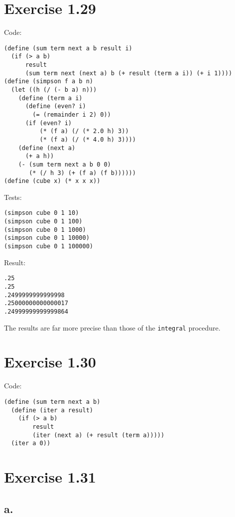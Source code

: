 \documentclass[../main.tex]{subfiles}
\begin{document}
\section{Exercise 1.29}

Code:

\begin{lstlisting}
(define (sum term next a b result i)
  (if (> a b)
      result
      (sum term next (next a) b (+ result (term a i)) (+ i 1))))
(define (simpson f a b n)
  (let ((h (/ (- b a) n)))
    (define (term a i)
      (define (even? i)
        (= (remainder i 2) 0))
      (if (even? i)
          (* (f a) (/ (* 2.0 h) 3))
          (* (f a) (/ (* 4.0 h) 3))))
    (define (next a)
      (+ a h))
    (- (sum term next a b 0 0)
       (* (/ h 3) (+ (f a) (f b))))))
(define (cube x) (* x x x))
\end{lstlisting}

Tests:

\begin{lstlisting}
(simpson cube 0 1 10)
(simpson cube 0 1 100)
(simpson cube 0 1 1000)
(simpson cube 0 1 10000)
(simpson cube 0 1 100000)
\end{lstlisting}

Result:

\begin{lstlisting}
.25
.25
.2499999999999998
.25000000000000017
.24999999999999864
\end{lstlisting}

The results are far more precise than
 those of the \lstinline{integral}
 procedure.

\section{Exercise 1.30}

Code:

\begin{lstlisting}
(define (sum term next a b)
  (define (iter a result)
    (if (> a b)
        result
        (iter (next a) (+ result (term a)))))
  (iter a 0))
\end{lstlisting}

\section{Exercise 1.31}

\subsection*{a.}
\end{document}
